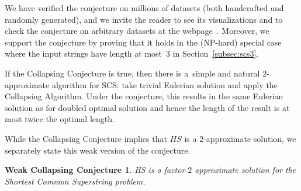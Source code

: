 We have verified the conjecture on millions of datasets (both handcrafted and randomly generated), and we invite the reader to see its visualizations and to check the conjecture on arbitrary datasets at the webpage~\cite{webpage}. 
Moreover, 
we support the conjecture by proving that it holds in the (NP-hard) special case where the input strings have length at most~3 in Section~\ref{subsec:scs3}.

If the Collapsing Conjecture is true, then there is a~simple and natural 2-approximate algorithm for SCS: take trivial Eulerian solution and apply the Collapsing Algorithm. Under the conjecture, this results in the same Eulerian solution as for doubled optimal solution and hence the length of the result is at most twice the optimal length.

While the Collapsing Conjecture implies that $HS$ is a $2$-approximate solution, we separately state this weak version of the conjecture.

\newtheorem*{wcc}{Weak Collapsing Conjecture}
\begin{wcc}
    HS is a factor $2$ approximate solution for the Shortest Common Superstring problem.
\end{wcc}